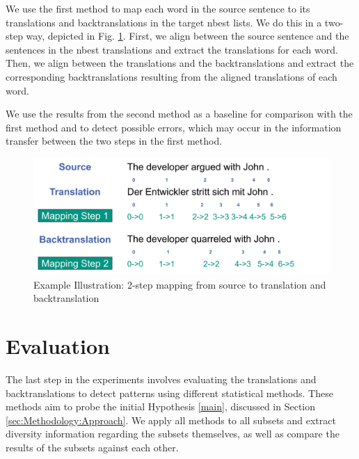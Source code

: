 We use the first method to map each word in the source sentence to its translations and backtranslations in the target nbest lists. We do this in a two-step way, depicted in Fig. \ref{fig:alignment}. First, we align between the source sentence and the sentences in the nbest translations and extract the translations for each word. Then, we align between the translations and the backtranslations and extract the corresponding backtranslations resulting from the aligned translations of each word. 

We use the results from the second method as a baseline for comparison with the first method and to detect possible errors, which may occur in the information transfer between the two steps in the first method.

\begin{figure}
  \centering
  \includegraphics[scale=0.5]{figures/alignment.png}
  \caption{Example Illustration: 2-step mapping from source to translation and backtranslation}
  \label{fig:alignment}
\end{figure}

\section{Evaluation}
\label{sec:Base_Experiment:Evaluation}

The last step in the experiments involves evaluating the translations and backtranslations to detect patterns using different statistical methods. These methods aim to probe the initial Hypothesis \ref{main}, discussed in Section \ref{sec:Methodology:Approach}. We apply all methods to all subsets and extract diversity information regarding the subsets themselves, as well as compare the results of the subsets against each other.



